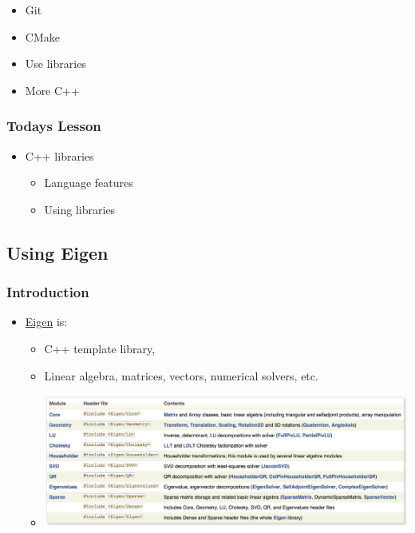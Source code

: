 \begin{itemize}
\itemsep1pt\parskip0pt
\item
  Git
\item
  CMake
\item
  Use libraries
\item
  More C++
\end{itemize}

\subsubsection{Todays Lesson}\label{todays-lesson-2}

\begin{itemize}
\itemsep1pt\parskip0pt
\item
  C++ libraries

  \begin{itemize}
  \itemsep1pt\parskip0pt
  \item
    Language features
  \item
    Using libraries
  \end{itemize}
\end{itemize}

\subsection{Using Eigen}\label{using-eigen}

\subsubsection{Introduction}\label{introduction-2}

\begin{itemize}
\itemsep1pt\parskip0pt
\item
  \href{http://eigen.tuxfamily.org}{Eigen} is:

  \begin{itemize}
  \itemsep1pt\parskip0pt
  \item
    C++ template library,
  \item
    Linear algebra, matrices, vectors, numerical solvers, etc.
  \item
    \includegraphics{88cpplibraries/figures/eigenContents.png}
  \end{itemize}
\end{itemize}

